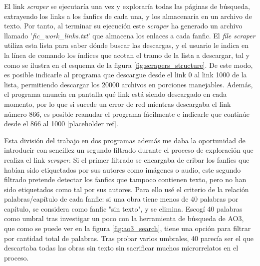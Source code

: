 \documentclass{pre-tfg}
\newcommand{\refToScraperExecution}{[placeholder ref]}
\begin{document}
El link \textit{scraper} se ejecutaría una vez y exploraría todas las páginas de búsqueda, extrayendo los links a los fanfics de cada una, y los almacenaría en un archivo de texto. Por tanto, al terminar su ejecución este \textit{scraper} ha generado un archivo llamado '\textit{fic\_work\_links.txt}' que almacena los enlaces a cada fanfic. El \textit{file scraper} utiliza esta lista para saber dónde buscar las descargas, y el usuario le indica en la línea de comando los índices que acotan el tramo de la lista a descargar, tal y como se ilustra en el esquema de la figura \ref{fig:scrapers_structure}. De este modo, es posible indicarle al programa que descargue desde el link 0 al link 1000 de la lista, permitiendo descargar los 20000 archivos en porciones manejables. Además, el programa anuncia en pantalla qué link está siendo descargado en cada momento, por lo que si sucede un error de red mientras descargaba el link número 866, es posible reanudar el programa fácilmente e indicarle que continúe desde el 866 al 1000 \refToScraperExecution.

Esta división del trabajo en dos programas además me daba la oportunidad de introducir con sencillez un segundo filtrado durante el proceso de exploración que realiza el link \textit{scraper}. Si el primer filtrado se encargaba de cribar los fanfics que habían sido etiquetados por sus autores como imágenes o audio, este segundo filtrado pretende detectar los fanfics que tampoco contienen texto, pero no han sido etiquetados como tal por sus autores. Para ello usé el criterio de la relación palabras/capítulo de cada fanfic: si una obra tiene menos de 40 palabras por capítulo, se considera como fanfic "sin texto", y se elimina. Escogí 40 palabras como umbral tras investigar un poco con la herramienta de búsqueda de AO3, que como se puede ver en la figura \ref{fig:ao3_search}, tiene una opción para filtrar por cantidad total de palabras. Tras probar varios umbrales, 40 parecía ser el que descartaba todas las obras sin texto sin sacrificar muchos microrrelatos en el proceso.
\end{document}
